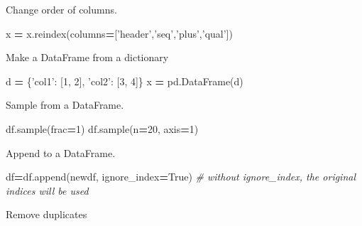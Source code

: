 \documentclass[]{book}
\newenvironment{Shaded}{\begin{snugshade}}{\end{snugshade}}
\newcommand{\DecValTok}[1]{\textcolor[rgb]{0.00,0.00,0.81}{#1}}
\newcommand{\StringTok}[1]{\textcolor[rgb]{0.31,0.60,0.02}{#1}}
\newcommand{\CommentTok}[1]{\textcolor[rgb]{0.56,0.35,0.01}{\textit{#1}}}
\newcommand{\VariableTok}[1]{\textcolor[rgb]{0.00,0.00,0.00}{#1}}
\newcommand{\OperatorTok}[1]{\textcolor[rgb]{0.81,0.36,0.00}{\textbf{#1}}}
\newcommand{\NormalTok}[1]{#1}
\begin{document}
Change order of columns.

\begin{Shaded}
\begin{Highlighting}[]
\NormalTok{x }\OperatorTok{=}\NormalTok{ x.reindex(columns}\OperatorTok{=}\NormalTok{[}\StringTok{'header'}\NormalTok{,}\StringTok{'seq'}\NormalTok{,}\StringTok{'plus'}\NormalTok{,}\StringTok{'qual'}\NormalTok{])}
\end{Highlighting}
\end{Shaded}

Make a DataFrame from a dictionary

\begin{Shaded}
\begin{Highlighting}[]
\NormalTok{d }\OperatorTok{=}\NormalTok{ \{}\StringTok{'col1'}\NormalTok{: [}\DecValTok{1}\NormalTok{, }\DecValTok{2}\NormalTok{], }\StringTok{'col2'}\NormalTok{: [}\DecValTok{3}\NormalTok{, }\DecValTok{4}\NormalTok{]\}}
\NormalTok{x }\OperatorTok{=}\NormalTok{ pd.DataFrame(d)}
\end{Highlighting}
\end{Shaded}

Sample from a DataFrame.

\begin{Shaded}
\begin{Highlighting}[]
\NormalTok{df.sample(frac}\OperatorTok{=}\DecValTok{1}\NormalTok{)}
\NormalTok{df.sample(n}\OperatorTok{=}\DecValTok{20}\NormalTok{, axis}\OperatorTok{=}\DecValTok{1}\NormalTok{)}
\end{Highlighting}
\end{Shaded}

Append to a DataFrame.

\begin{Shaded}
\begin{Highlighting}[]
\NormalTok{df}\OperatorTok{=}\NormalTok{df.append(newdf, ignore_index}\OperatorTok{=}\VariableTok{True}\NormalTok{) }\CommentTok{# without ignore_index, the original indices will be used}
\end{Highlighting}
\end{Shaded}

Remove duplicates
\end{document}
